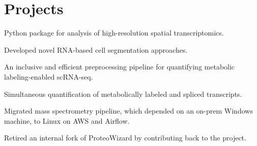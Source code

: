 \documentclass[]{resume}
\begin{document}
\begin{minipage}[t]{0.69\textwidth}


\section{Projects}

\vspace{\topsep} %
\begin{tightemize}
\item {Python package for analysis of high-resolution spatial transcriptomics.}
\item {Developed novel RNA-based cell segmentation approaches.}
\end{tightemize}
\sectionsep

\begin{tightemize}
\item {An inclusive and efficient preprocessing pipeline for quantifying metabolic labeling-enabled scRNA-seq.}
\item {Simultaneous quantification of metabolically labeled and spliced transcripts.}
\end{tightemize}
\sectionsep

\begin{tightemize}
\item {Migrated mass spectrometry pipeline, which depended on an on-prem Windows machine, to Linux on AWS and Airflow.}
\item {Retired an internal fork of ProteoWizard by contributing back to the project.}
\end{tightemize}
\sectionsep



\end{minipage}
\end{document}
